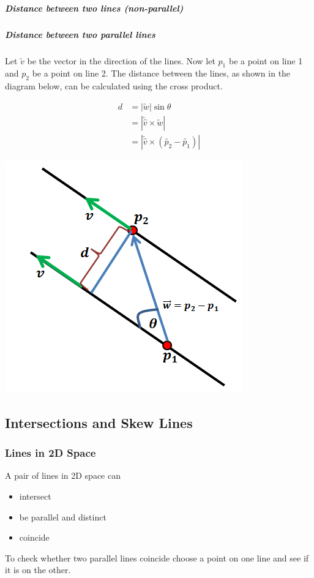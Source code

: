 \documentclass[a4paper,twoside,10pt]{article}
\begin{document}
			\subparagraph{Distance between two lines (non-parallel)}
			
			\subparagraph{Distance between two parallel lines} Let $\utilde{v}$ be the vector in the direction of the lines. Now let $p_1$ be a point on line 1 and $p_2$ be a point on line 2. The distance between the lines, as shown in the diagram below, can be calculated using the cross product.\\
			\begin{minipage}{0.5\linewidth}
				\begin{align*}
					d&=|\utilde{w}|\sin\theta \\
					&=\left|\utilde{\hat{v}}\times\utilde{w}\right|\\
					&=\left|\utilde{\hat{v}}\times\left(\utilde{p_2}-\utilde{p_1}\right)\right|
				\end{align*}
			\end{minipage}
			\hfill
			\begin{minipage}{0.5\linewidth}
				\includegraphics[width=0.5\linewidth]{vectorlinesdist.png}
			\end{minipage}
		\subsection{Intersections and Skew Lines}
			\subsubsection{Lines in 2D Space} A pair of lines in 2D space can
			\begin{itemize}
				\item intersect
				\item be parallel and distinct
				\item coincide
			\end{itemize}
			To check whether two parallel lines coincide choose a point on one line and see if it is on the other.
			
\end{document}
